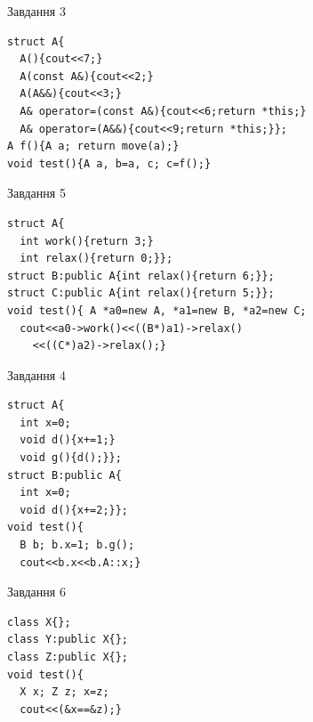 \documentclass[12pt, ukrainian]{article}
\begin{document}
{{{\begin{minipage}[t]{11cm}
               
{\begin{center}Завдання {3}\end{center}}
\vspace{-6mm}

\begin{verbatim}
struct A{
  A(){cout<<7;}
  A(const A&){cout<<2;}
  A(A&&){cout<<3;}
  A& operator=(const A&){cout<<6;return *this;}
  A& operator=(A&&){cout<<9;return *this;}};
A f(){A a; return move(a);}
void test(){A a, b=a, c; c=f();}
\end{verbatim}            


               
{\begin{center}Завдання {5}\end{center}}
\vspace{-6mm}

\begin{verbatim}
struct A{
  int work(){return 3;}
  int relax(){return 0;}};
struct B:public A{int relax(){return 6;}};
struct C:public A{int relax(){return 5;}};
void test(){ A *a0=new A, *a1=new B, *a2=new C;
  cout<<a0->work()<<((B*)a1)->relax()
    <<((C*)a2)->relax();}
\end{verbatim}            


\end{minipage}
\vline \hspace{8mm}
\begin{minipage}[t]{7cm}
               
{\begin{center}Завдання {4}\end{center}}
\vspace{-6mm}

\begin{verbatim}
struct A{
  int x=0;
  void d(){x+=1;}
  void g(){d();}};
struct B:public A{
  int x=0;
  void d(){x+=2;}};
void test(){
  B b; b.x=1; b.g();
  cout<<b.x<<b.A::x;}
\end{verbatim}            


               
{\begin{center}Завдання {6}\end{center}}
\vspace{-6mm}

\begin{verbatim}
class X{};
class Y:public X{};
class Z:public X{};
void test(){
  X x; Z z; x=z;
  cout<<(&x==&z);}
\end{verbatim}            



\end{minipage}}}}
\end{document}
